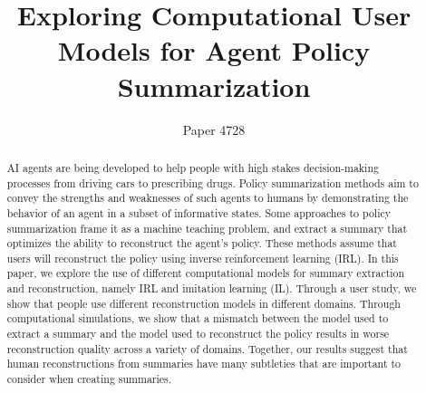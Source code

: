 \documentclass{article}
\title{Exploring Computational User Models for Agent Policy Summarization}
\author{Paper 4728}
\begin{document}
\maketitle


\begin{abstract}
AI agents  are  being  developed  to  help  people with high stakes decision-making processes from  driving  cars  to  prescribing  drugs. Policy summarization methods aim to convey the strengths and weaknesses of such agents to humans by demonstrating the behavior of an agent in a subset of informative states. Some approaches to policy summarization frame it as a machine teaching problem, and extract a summary that optimizes the ability to reconstruct the agent’s policy. These methods assume that users will reconstruct the policy using inverse reinforcement learning (IRL). In this paper, we explore the use of different computational models for summary extraction and reconstruction, namely IRL and imitation learning (IL). Through a user study, we show that people use different reconstruction models in different domains. Through computational simulations, we show that a mismatch between the model used to extract a summary and the model used to reconstruct the policy results in worse reconstruction quality across a variety of domains. Together, our results suggest that human reconstructions from summaries have many subtleties that are important to consider when creating summaries.
\end{abstract}



\end{document}
